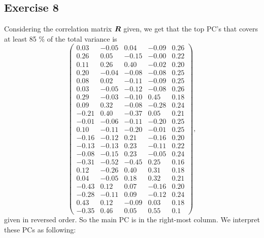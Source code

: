 
\subsection*{Exercise 8}
\label{sec:exercise-8}

Considering the correlation matrix $\bm{R}$ given, we get that the top
PC's that covers at least 85 \% of the total variance is 
\begin{equation*}
  \begin{pmatrix}
    0.03 &-0.05 &0.04 &-0.09 &0.26 \\ 
    0.26 &0.05 &-0.15 &-0.00 &0.22 \\ 
    0.11 &0.26 &0.40 &-0.02 &0.20 \\ 
    0.20 &-0.04 &-0.08 &-0.08 &0.25 \\ 
    0.08 &0.02 &-0.11 &-0.09 &0.25 \\ 
    0.03 &-0.05 &-0.12 &-0.08 &0.26 \\ 
    0.29 &-0.03 &-0.10 &0.45 &0.18 \\ 
    0.09 &0.32 &-0.08 &-0.28 &0.24 \\ 
    -0.21 &0.40 &-0.37 &0.05 &0.21 \\ 
    -0.01 &-0.06 &-0.11 &-0.20 &0.25 \\ 
    0.10 &-0.11 &-0.20 &-0.01 &0.25 \\ 
    -0.16 &-0.12 &0.21 &-0.16 &0.20 \\ 
    -0.13 &-0.13 &0.23 &-0.11 &0.22 \\ 
    -0.08 &-0.15 &0.23 &-0.05 &0.24 \\ 
    -0.31 &-0.52 &-0.45 &0.25 &0.16 \\ 
    0.12 &-0.26 &0.40 &0.31 &0.18 \\ 
    0.04 &-0.05 &0.18 &0.32 &0.21 \\ 
    -0.43 &0.12 &0.07 &-0.16 &0.20 \\ 
    -0.28 &-0.11 &0.09 &-0.12 &0.24 \\ 
    0.43 &0.12 &-0.09 &0.03 &0.18 \\ 
    -0.35 &0.46 &0.05 &0.55 &0.1
  \end{pmatrix},
\end{equation*}
given in reversed order. So the main PC is in the
right-most column. We interpret these PCs as following:
